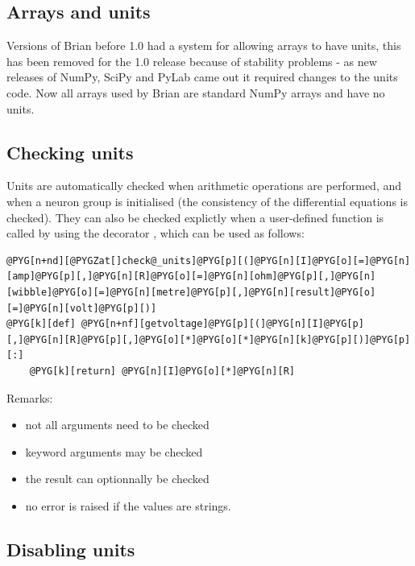 \documentclass[letterpaper,10pt,english]{manual}
\begin{document}
\subsection{Arrays and units}

Versions of Brian before 1.0 had a system for allowing arrays to have units, this has
been removed for the 1.0 release because of stability problems - as new releases of
NumPy, SciPy and PyLab came out it required changes to the units code. Now all arrays
used by Brian are standard NumPy arrays and have no units.


\subsection{Checking units}

Units are automatically checked when arithmetic operations are performed, and when
a neuron group is initialised (the consistency of the differential equations is checked).
They can also be checked explictly when a user-defined function is called by using the
decorator , which can be used as follows:

\begin{Verbatim}[commandchars=@\[\]]
@PYG[n+nd][@PYGZat[]check@_units]@PYG[p][(]@PYG[n][I]@PYG[o][=]@PYG[n][amp]@PYG[p][,]@PYG[n][R]@PYG[o][=]@PYG[n][ohm]@PYG[p][,]@PYG[n][wibble]@PYG[o][=]@PYG[n][metre]@PYG[p][,]@PYG[n][result]@PYG[o][=]@PYG[n][volt]@PYG[p][)]
@PYG[k][def] @PYG[n+nf][getvoltage]@PYG[p][(]@PYG[n][I]@PYG[p][,]@PYG[n][R]@PYG[p][,]@PYG[o][*]@PYG[o][*]@PYG[n][k]@PYG[p][)]@PYG[p][:]
    @PYG[k][return] @PYG[n][I]@PYG[o][*]@PYG[n][R]
\end{Verbatim}

Remarks:
\begin{itemize}
\item {} 
not all arguments need to be checked

\item {} 
keyword arguments may be checked

\item {} 
the result can optionnally be checked

\item {} 
no error is raised if the values are strings.

\end{itemize}


\subsection{Disabling units}
\end{document}
